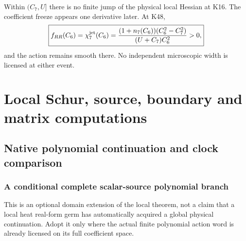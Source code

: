 \documentclass[11pt,a4paper]{article}
\begin{document}
\begin{corollary}
\label{p3e:cor:unique-k16-interior-action-junction}
Within $(C_7,U]$ there is no finite jump of the physical local Hessian at
K16.  The coefficient freeze appears one derivative later.  At K48,
\begin{equation}
\label{p3e:eq:k48-smooth-action-hessian}
 \boxed{
 f_{RR}(C_6)=\chi_7^{\rm jet}(C_6)
 =\frac{(1+n_7(C_6))(C_6^2-C_7^2)}{(U+C_7)C_6^2}>0,}
\end{equation}
and the action remains smooth there.  No independent microscopic width is
licensed at either event.
\end{corollary}


\section{Local Schur, source, boundary and matrix computations}
\label{p3g:sec:sources}
\subsection{Native polynomial continuation and clock comparison}
\label{p3f:app:v2190-native-continuation}

\subsubsection{A conditional complete scalar-source polynomial branch}
This is an optional domain extension of the local theorem, not a claim
that a local heat real-form germ has automatically acquired a global
physical continuation.  Adopt it only where the actual finite polynomial
action word is already licensed on its full coefficient space.
\end{document}
